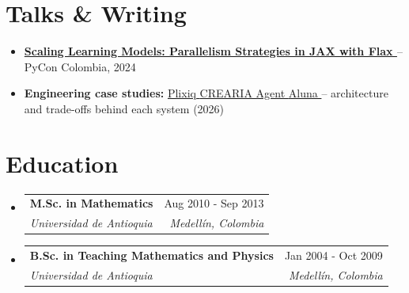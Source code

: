 \documentclass[letterpaper,10pt]{article}
\makeatletter
\newcommand{\resumeSubheading}[4]{
  \vspace{-2pt}
  \item[]
  \begin{tabular*}{\textwidth}{@{\extracolsep{\fill}}l r}
    \textbf{#1} & #2 \\
    \textit{#3} & \textit{#4} \\
  \end{tabular*}
  \vspace{-5pt}
}
\newcommand{\normalfaExternalLink}{{\mdseries\faExternalLink}}
\newcommand{\normalfaYoutube}{{\mdseries\faYoutube}}
\makeatother
\begin{document}
\section{Talks \& Writing}
\begin{itemize}[leftmargin=*, itemsep=0pt]
    \item \textbf{\href{https://www.youtube.com/watch?v=m4hP1soE414}{Scaling Learning Models: Parallelism Strategies in JAX with Flax \normalfaYoutube}} -- PyCon Colombia, 2024
    \item \textbf{Engineering case studies:} \href{https://www.asanchezyali.com/blog/case-studies/plixiq}{Plixiq \normalfaExternalLink} \textperiodcentered{} \href{https://www.asanchezyali.com/blog/case-studies/crearia-agent}{CREARIA Agent \normalfaExternalLink} \textperiodcentered{} \href{https://www.asanchezyali.com/blog/case-studies/aluna}{Aluna \normalfaExternalLink} -- architecture and trade-offs behind each system (2026)
\end{itemize}

\section{Education}
\begin{itemize}[leftmargin=0pt, itemindent=0pt, label={}]
\resumeSubheading
{M.Sc. in Mathematics}{Aug 2010 - Sep 2013}
{Universidad de Antioquia}{Medell\'in, Colombia}
\resumeSubheading
{B.Sc. in Teaching Mathematics and Physics}{Jan 2004 - Oct 2009}
{Universidad de Antioquia}{Medell\'in, Colombia}
\end{itemize}
\end{document}
